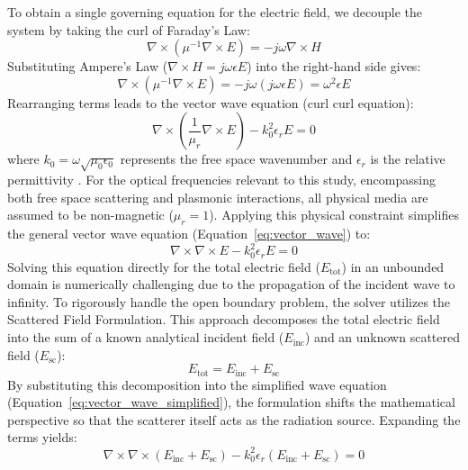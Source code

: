 To obtain a single governing equation for the electric field, we decouple the system by taking the curl of Faraday's Law:
\begin{equation}
\nabla \times (\mu^{-1}\nabla \times E) = -j\omega\nabla \times H
\end{equation}
Substituting Ampere's Law ($\nabla \times H = j\omega\epsilon E$) into the right-hand side gives:
\begin{equation}
\nabla \times (\mu^{-1}\nabla \times E) = -j\omega(j\omega\epsilon E) = \omega^2\epsilon E
\end{equation}
Rearranging terms leads to the vector wave equation (curl curl equation):
\begin{equation}
\nabla \times \left( \frac{1}{\mu_r} \nabla \times E \right) - k_0^2 \epsilon_r E = 0
\label{eq:vector_wave}
\end{equation}
where $k_0 = \omega\sqrt{\mu_0\epsilon_0}$ represents the free space wavenumber and $\epsilon_r$ is the relative permittivity \citep{Jin2015}. For the optical frequencies relevant to this study, encompassing both free space scattering and plasmonic interactions, all physical media are assumed to be non-magnetic ($\mu_r = 1$). Applying this physical constraint simplifies the general vector wave equation (Equation~\ref{eq:vector_wave}) to:
\begin{equation}
\nabla \times \nabla \times E - k_0^2 \epsilon_r E = 0
\label{eq:vector_wave_simplified}
\end{equation}
Solving this equation directly for the total electric field ($E_{\text{tot}}$) in an unbounded domain is numerically challenging due to the propagation of the incident wave to infinity. To rigorously handle the open boundary problem, the solver utilizes the Scattered Field Formulation. This approach decomposes the total electric field into the sum of a known analytical incident field ($E_{\text{inc}}$) and an unknown scattered field ($E_{\text{sc}}$):
\begin{equation}
E_{\text{tot}} = E_{\text{inc}} + E_{\text{sc}}
\label{eq:field_decomp}
\end{equation}
By substituting this decomposition into the simplified wave equation (Equation~\ref{eq:vector_wave_simplified}), the formulation shifts the mathematical perspective so that the scatterer itself acts as the radiation source. Expanding the terms yields:
\begin{equation}
\nabla \times \nabla \times (E_{\text{inc}} + E_{\text{sc}}) - k_0^2 \epsilon_r (E_{\text{inc}} + E_{\text{sc}}) = 0
\label{eq:expanded}
\end{equation}

